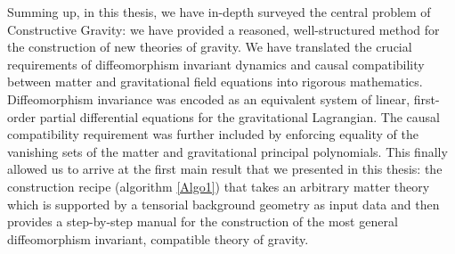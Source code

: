 Summing up, in this thesis, we have in-depth surveyed the central problem of Constructive Gravity: we have provided a reasoned, well-structured method for the construction of new theories of gravity. We have translated the crucial requirements of diffeomorphism invariant dynamics and causal compatibility between matter and gravitational field equations into rigorous mathematics. Diffeomorphism invariance was encoded as an equivalent system of linear, first-order partial differential equations for the gravitational Lagrangian. The causal compatibility requirement was further included by enforcing equality of the vanishing sets of the matter and gravitational principal polynomials.
This finally allowed us to arrive at the first main result that we presented in this thesis: the construction recipe (algorithm \ref{Algo1}) that takes an arbitrary matter theory which is supported by a tensorial background geometry as input data and then provides a step-by-step manual for the construction of the most general diffeomorphism invariant, compatible theory of gravity. 

